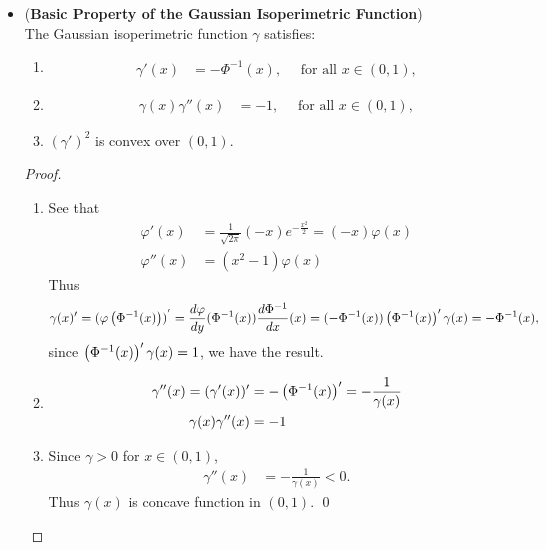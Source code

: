\documentclass[11pt]{article}
\begin{document}
\begin{itemize}
\item \begin{proposition}(\textbf{Basic Property of the Gaussian Isoperimetric Function}) \citep{boucheron2013concentration} \\
The Gaussian isoperimetric function $\gamma$ satisfies:
\begin{enumerate}
\item 
\begin{align*}
\gamma'(x) &= - \Phi^{-1}(x), \quad \text{ for all }x \in (0,1),
\end{align*}
\item 
\begin{align*}
\gamma(x)\gamma''(x) &= - 1, \quad \text{ for all }x \in (0,1),
\end{align*}
\item $(\gamma')^2$ is convex over $(0, 1).$
\end{enumerate}
\end{proposition}
\begin{proof}
\begin{enumerate}
\item See that
\begin{align*}
\varphi'(x) &= \frac{1}{\sqrt{2\pi}}(-x)e^{-\frac{x^2}{2}} = (-x)\varphi(x)\\
\varphi''(x) &= (x^2-1)\varphi(x)
\end{align*} Thus
\begin{align*}
\gamma(x)' &= (\varphi\left(\Phi^{-1}(x)\right))^{'} = \frac{d\varphi}{dy}(\Phi^{-1}(x)) \frac{d\Phi^{-1}}{dx}(x) =(-\Phi^{-1}(x)) \left(\Phi^{-1}(x)\right)'\gamma(x) = -\Phi^{-1}(x), 
\end{align*} since $\left(\Phi^{-1}(x)\right)'\gamma(x) = 1$, we have the result. 

\item \begin{align*}
\gamma''(x) = (\gamma'(x))' &= -\left(\Phi^{-1}(x)\right)' = - \frac{1}{\gamma(x)}\\
\gamma(x)\gamma''(x) &= -1
\end{align*}

\item Since $\gamma > 0$ for $x \in (0, 1)$, 
\begin{align*}
\gamma''(x) &= -\frac{1}{\gamma(x)} < 0.
\end{align*}  Thus $\gamma(x)$ is concave function  in $(0, 1)$. \qed
\end{enumerate}
\end{proof}


\end{itemize}
\end{document}
